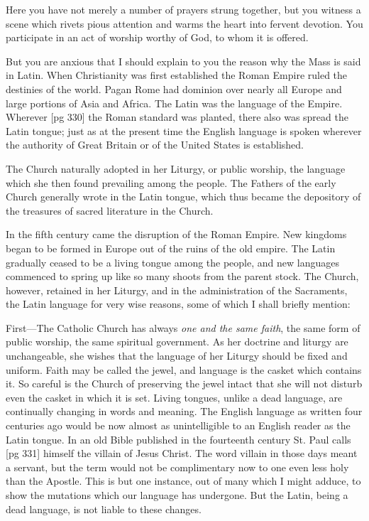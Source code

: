 Here you have not merely a number of prayers
strung together, but you witness a scene which
rivets pious attention and warms the heart into
fervent devotion. You participate in an act of
worship worthy of God, to whom it is offered.

But you are anxious that I should explain to
you the reason why the Mass is said in Latin.
When Christianity was first established the
Roman Empire ruled the destinies of the world.
Pagan Rome had dominion over nearly all Europe
and large portions of Asia and Africa. The
Latin was the language of the Empire. Wherever
[pg 330]
the Roman standard was planted, there also
was spread the Latin tongue; just as at the present
time the English language is spoken wherever
the authority of Great Britain or of the United
States is established.

The Church naturally adopted in her Liturgy,
or public worship, the language which she then
found prevailing among the people. The Fathers
of the early Church generally wrote in the Latin
tongue, which thus became the depository of the
treasures of sacred literature in the Church.

In the fifth century came the disruption of the
Roman Empire. New kingdoms began to be
formed in Europe out of the ruins of the old empire.
The Latin gradually ceased to be a living
tongue among the people, and new languages commenced
to spring up like so many shoots from the
parent stock. The Church, however, retained in
her Liturgy, and in the administration of the
Sacraments, the Latin language for very wise reasons,
some of which I shall briefly mention:

First—The Catholic Church has always \emph{one and
the same faith}, the same form of public worship,
the same spiritual government. As her doctrine
and liturgy are unchangeable, she wishes that the
language of her Liturgy should be fixed and uniform.
Faith may be called the jewel, and language
is the casket which contains it. So careful is
the Church of preserving the jewel intact that she
will not disturb even the casket in which it is set.
Living tongues, unlike a dead language, are continually
changing in words and meaning. The
English language as written four centuries ago
would be now almost as unintelligible to an English
reader as the Latin tongue. In an old Bible
published in the fourteenth century St. Paul calls
[pg 331]
himself the villain of Jesus Christ. The word
villain in those days meant a servant, but the term
would not be complimentary now to one even less
holy than the Apostle. This is but one instance,
out of many which I might adduce, to show the
mutations which our language has undergone. But
the Latin, being a dead language, is not liable to
these changes.

